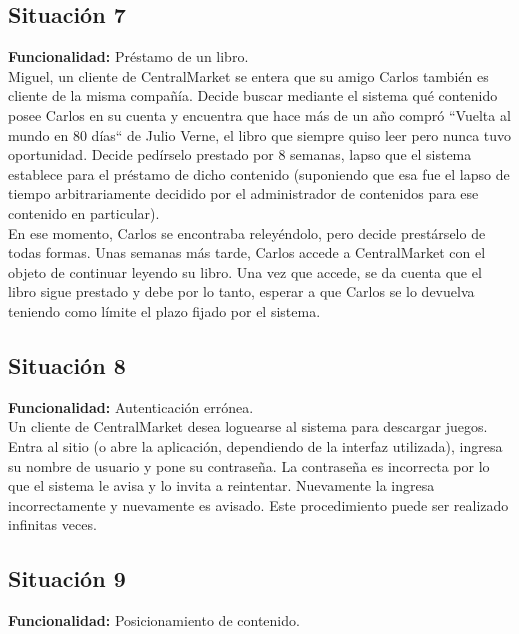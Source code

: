 \documentclass[11pt, a4paper, spanish]{article}
\begin{document}
\subsection{Situaci\'on 7}

	\textbf{Funcionalidad:} Pr\'estamo de un libro.\\

	Miguel, un cliente de CentralMarket se entera que su amigo Carlos tambi\'en es cliente de la misma compa\~{n}\'ia. Decide buscar mediante el sistema    
   qu\'e contenido posee Carlos en su cuenta y encuentra que hace m\'as de un a\~{n}o compr\'o ``Vuelta al mundo en 80 d\'ias`` de Julio Verne, el libro que siempre quiso leer pero nunca tuvo oportunidad. Decide ped\'irselo prestado por 8 semanas, lapso que el sistema establece para el pr\'estamo de dicho contenido (suponiendo que esa fue el lapso de tiempo arbitrariamente decidido por el administrador de contenidos para ese contenido en particular). \\

        En ese momento, Carlos se encontraba reley\'endolo, pero decide prest\'arselo de todas formas. Unas semanas m\'as tarde, Carlos accede a  CentralMarket con el objeto de continuar leyendo su libro. Una vez que accede, se da cuenta que el libro sigue prestado y debe por lo tanto, esperar a que Carlos se lo devuelva teniendo como l\'imite el plazo fijado por el sistema. 

\subsection{Situaci\'on 8}

	\textbf{Funcionalidad:} Autenticaci\'on err\'onea.\\

	Un cliente de CentralMarket desea loguearse al sistema para descargar juegos. Entra al sitio (o abre la aplicaci\'on, dependiendo de la interfaz 
   utilizada), ingresa su nombre de usuario y pone su contrase\~{n}a. La contrase\~{n}a es incorrecta por lo que el sistema le avisa y lo invita a reintentar. 
   Nuevamente la ingresa incorrectamente y nuevamente es avisado.
   Este procedimiento puede ser realizado infinitas veces.

\subsection{Situaci\'on 9}

	\textbf{Funcionalidad:} Posicionamiento de contenido.\\
\end{document}
